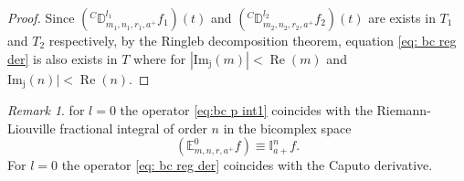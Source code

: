 \documentclass[a4paper,12pt]{article}
\theoremstyle{remark}
\newtheorem{remark}[theorem]{Remark}
\begin{document}
\begin{proof}
	Since $(^C\mathbb{D}_{m_1,n_1,r_1,a^+}^{l_1} f_1)(t)$ and $(^C\mathbb{D}_{m_2,n_2,r_2,a^+}^{l_2} f_2)(t)$ are exists in $T_1$ and $ T_2$ respectively, by the Ringleb
	decomposition theorem, equation \eqref{eq: bc reg der} is also exists in $T$ where for 
	$|\operatorname{Im_j}(m)|<\operatorname{Re}(m)$ and 
	$\operatorname{Im_j}(n)|<\operatorname{Re}(n).$
	\end{proof}
\begin{remark}
\noindent
for $l=0$ the operator \eqref{eq:bc p int1} coincides with the Riemann-Liouville fractional integral  of order $n$ in the bicomplex space
\begin{equation}\label{eq:bc relation}
(\mathbb{E}_{m,n,r,a^+}^0 f)\equiv \mathbb{I}_{a+}^n f.
\end{equation}
For $l=0$ the operator \eqref{eq: bc reg der} coincides with the Caputo derivative.
\end{remark}
\end{document}
